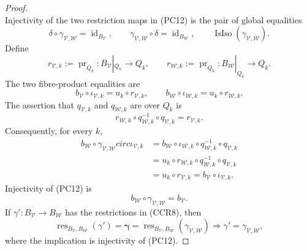 \begin{proof}
\[  \]
  Injectivity of the two restriction maps in (PC12) is the pair of global
  equalities
  \[
    \delta\circ\gamma_{\mathcal V,\mathcal W}
      =\operatorname{id}_{B_{\mathcal V}},\qquad
    \gamma_{\mathcal V,\mathcal W}\circ\delta
      =\operatorname{id}_{B_{\mathcal W}},\qquad
    \operatorname{IsIso}(\gamma_{\mathcal V,\mathcal W}).        \tag{CCR10}
  \]
  Define
  \[
    r_{\mathcal V,k}:=\operatorname{pr}_{Q_k}\colon
      B_{\mathcal V}|_{Q_k}\to Q_k,\qquad
    r_{\mathcal W,k}:=\operatorname{pr}_{Q_k}\colon
      B_{\mathcal W}|_{Q_k}\to Q_k.
  \]
  The two fibre-product equalities are
  \[
    b_{\mathcal V}\circ\iota_{\mathcal V,k}
      =u_k\circ r_{\mathcal V,k},\qquad
    b_{\mathcal W}\circ\iota_{\mathcal W,k}
      =u_k\circ r_{\mathcal W,k}.                                \tag{CCR10a}
  \]
  The assertion that $q_{\mathcal V,k}$ and $q_{\mathcal W,k}$ are over
  $Q_k$ is
  \[
    r_{\mathcal W,k}\circ q_{\mathcal W,k}^{-1}\circ
      q_{\mathcal V,k}=r_{\mathcal V,k}.
  \]
  Consequently, for every $k$,
  \[
  \begin{aligned}
    b_{\mathcal W}\circ\gamma_{\mathcal V,\mathcal W}circ
      \iota_{\mathcal V,k}
      &=b_{\mathcal W}\circ\iota_{\mathcal W,k}\circ
        q_{\mathcal W,k}^{-1}\circ q_{\mathcal V,k}\\
      &=u_k\circ r_{\mathcal W,k}\circ
        q_{\mathcal W,k}^{-1}\circ q_{\mathcal V,k}\\
      &=u_k\circ r_{\mathcal V,k}
       =b_{\mathcal V}\circ\iota_{\mathcal V,k}.
  \end{aligned}
  \]
  Injectivity of (PC12) is
  \[
    b_{\mathcal W}\circ\gamma_{\mathcal V,\mathcal W}
      =b_{\mathcal V}.                                           \tag{CCR11}
  \]
  If $\gamma'\colon B_{\mathcal V}\to B_{\mathcal W}$ has the restrictions
  in (CCR8), then
  \[
    \operatorname{res}_{B_{\mathcal V},B_{\mathcal W}}(\gamma')
      =\boldsymbol\gamma
      =\operatorname{res}_{B_{\mathcal V},B_{\mathcal W}}
        (\gamma_{\mathcal V,\mathcal W})
      \Longrightarrow
      \gamma'=\gamma_{\mathcal V,\mathcal W},                   \tag{CCR12}
  \]
  where the implication is injectivity of (PC12).
\end{proof}


